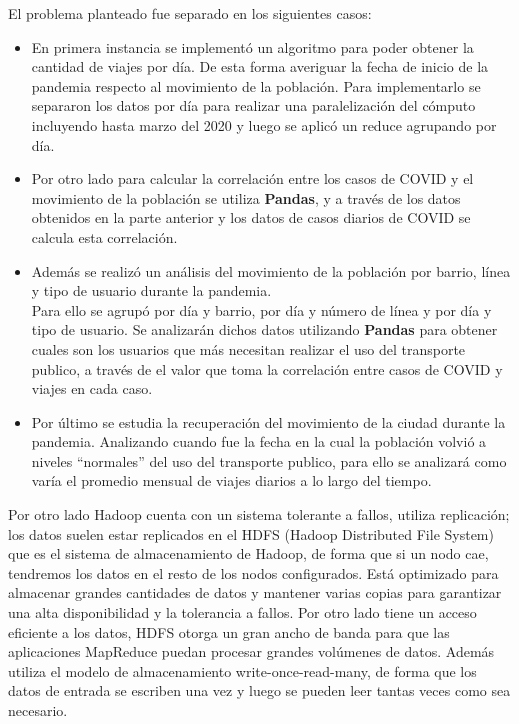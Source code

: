\documentclass[conference]{IEEEtran}
\begin{document}
El problema planteado fue separado en los siguientes casos:
\begin{itemize}
\item 
En primera instancia se implementó un algoritmo para poder obtener la cantidad de viajes por día. De esta forma averiguar la fecha de inicio de la pandemia respecto al movimiento de la población. Para implementarlo se separaron los datos por día para realizar una paralelización del cómputo incluyendo hasta marzo del 2020 y luego se aplicó un reduce agrupando por día.
\item
Por otro lado para calcular la correlación entre los casos de COVID y el movimiento de la población se utiliza \textbf{Pandas}, y a través de los datos obtenidos en la parte anterior y los datos de casos diarios de COVID se calcula esta correlación.
\item
Además se realizó un análisis del movimiento de la población por barrio, línea y tipo de usuario durante la pandemia. \\
Para ello se agrupó por día y barrio, por día y número de línea y por día y tipo de usuario. Se analizarán dichos datos utilizando \textbf{Pandas} para obtener cuales son los usuarios que más necesitan realizar el uso del transporte publico, a través de el valor que toma la correlación entre casos de COVID y viajes en cada caso.
\item
Por último se estudia la recuperación del movimiento de la ciudad durante la pandemia. Analizando cuando fue la fecha en la cual la población volvió a niveles ``normales'' del uso del transporte publico, para ello se analizará como varía el promedio mensual de viajes diarios a lo largo del tiempo.
\end{itemize}

Por otro lado Hadoop cuenta con un sistema tolerante a fallos, utiliza replicación; los datos suelen estar replicados en el HDFS (Hadoop Distributed File System) que es el sistema de almacenamiento de Hadoop, de forma que si un nodo cae, tendremos los datos en el resto de los nodos configurados. Está optimizado para almacenar grandes cantidades de datos y mantener varias copias para garantizar una alta disponibilidad y la tolerancia a fallos.
Por otro lado tiene un acceso eficiente a los datos, HDFS otorga un gran ancho de banda para que las aplicaciones MapReduce puedan procesar grandes volúmenes de datos. Además utiliza el modelo de almacenamiento write-once-read-many, de forma que los datos de entrada se escriben una vez y luego se pueden leer tantas veces como sea necesario.
\end{document}
